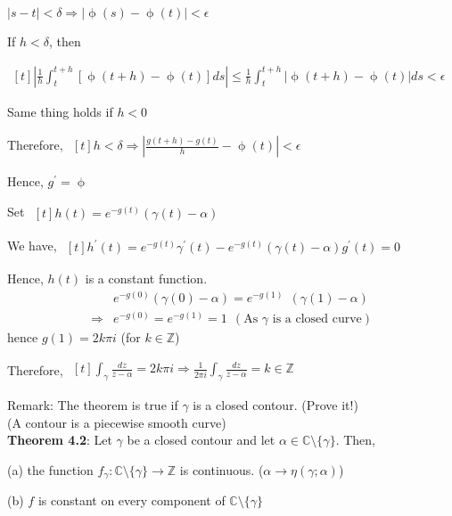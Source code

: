 \documentclass{article}
\begin{document}
\begin{flushleft}
$|s-t|<\delta \Rightarrow |\upphi(s)-\upphi(t)|<\epsilon$ 

If $h<\delta$, then

$\begin{aligned}[t] |\frac{1}{h}\int_{t}^{t+h}[\upphi(t+h)-\upphi(t)]ds|\leq \frac{1}{h}\int_{t}^{t+h}|\upphi(t+h)-\upphi(t)| ds<\epsilon \end{aligned}$

Same thing holds if $h<0$

Therefore, $\begin{aligned}[t] h<\delta \Rightarrow |\frac{g(t+h)-g(t)}{h}-\upphi(t)|<\epsilon \end{aligned}$

Hence, $g^{'}=\upphi$

Set $\begin{aligned}[t] h(t)=e^{-g(t)}(\gamma(t)-\alpha)\end{aligned}$

We have, $\begin{aligned}[t] h^{'}(t)=e^{-g(t)}\gamma^{'}(t)-e^{-g(t)}(\gamma(t)-\alpha)g^{'}(t)=0\end{aligned}$

Hence, $h(t)$ is a constant function.
\begin{align}
&e^{-g(0)}(\gamma(0)-\alpha)=e^{-g(1)}\:\:(\gamma(1)-\alpha)\nonumber \\
\Rightarrow &e^{-g(0)}=e^{-g(1)}=1 \:\:(\text{As $\gamma$ is a closed curve})\nonumber
\end{align}
hence $g(1)=2k\pi i$ (for $k\in \mathds{Z}$)

\clearpage

Therefore, $\begin{aligned}[t] \int_{\gamma}^{}\frac{dz}{z-\alpha}=2k\pi i\Rightarrow \frac{1}{2\pi i}\int_{\gamma}^{}\frac{dz}{z-\alpha}=k\in \mathds{Z} \end{aligned}$ 

Remark: The theorem is true if $\gamma$ is a closed contour. (Prove it!) \\(A contour is a piecewise smooth curve)\\
\vspace{3mm}
\textbf{Theorem 4.2}: Let $\gamma$ be a closed contour and let $\alpha \in \mathds{C}\setminus \{\gamma\}$. Then,

(a) the function $f_{\gamma}: \mathds{C}\setminus \{\gamma\}\rightarrow \mathds{Z}$ is continuous. ($\alpha \rightarrow \eta(\gamma;\alpha)$)

(b) $f$ is constant on every component of $\mathds{C}\setminus \{\gamma\}$


\end{flushleft}
\end{document}
